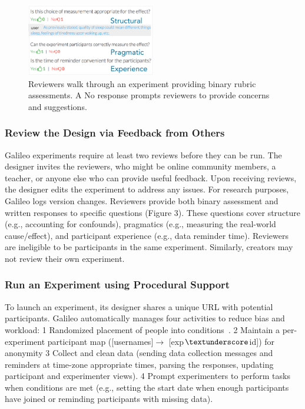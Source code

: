 \begin{figure}
  \centering
  \includegraphics[width=0.5\textwidth]{figures/galileo/galileo-2-review}
  \caption[Reviewers walk through an experiment providing binary rubric assessments]
{Reviewers walk through an experiment providing binary rubric assessments. A No response prompts reviewers to provide concerns and suggestions.}
  \label{fig:galileo-2-review}
\end{figure}

\subsubsection{Review the Design via Feedback from Others}
Galileo experiments require at least two reviews before they can be run. The designer invites the reviewers, who might be online community members, a teacher, or anyone else who can provide useful feedback. Upon receiving reviews, the designer edits the experiment to address any issues. For research purposes, Galileo logs version changes. Reviewers provide both binary assessment and written responses to specific questions (Figure 3). These questions cover structure (e.g., accounting for confounds), pragmatics (e.g., measuring the real-world cause/effect), and participant experience (e.g., data reminder time). Reviewers are ineligible to be participants in the same experiment. Similarly, creators may not review their own experiment. 

\subsubsection{Run an Experiment using Procedural Support}
To launch an experiment, its designer shares a unique URL with potential participants. Galileo automatically manages four activities to reduce bias and workload: 
1 Randomized placement of people into conditions~\cite{Martin2007}.
2 Maintain a per-experiment participant map ([usernames]$\rightarrow$ [exp$\textunderscore$id]) for anonymity
3 Collect and clean data (sending data collection messages and reminders at time-zone appropriate times, parsing the responses, updating participant and experimenter views). 
4 Prompt experimenters to perform tasks when conditions are met (e.g., setting the start date when enough participants have joined or reminding participants with missing data). 

